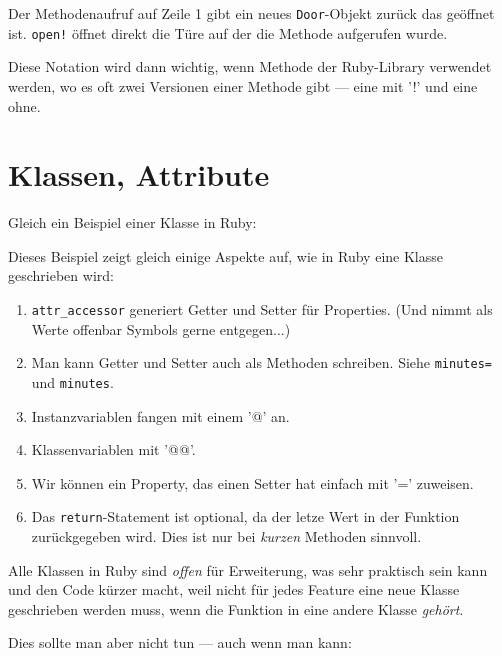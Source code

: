 \documentclass[a4book,11pt,twoside]{scrbook}
\begin{document}


Der Methodenaufruf auf Zeile 1 gibt ein neues \texttt{Door}-Objekt zurück das geöffnet ist. \texttt{open!} öffnet direkt die Türe auf der die Methode aufgerufen wurde.

Diese Notation wird dann wichtig, wenn Methode der Ruby-Library verwendet werden, wo es oft zwei Versionen einer Methode gibt — eine mit '!' und eine ohne.







\section{Klassen, Attribute} %
\label{sec:klassen_methoden_attribute}
Gleich ein Beispiel einer Klasse in Ruby:



Dieses Beispiel zeigt gleich einige Aspekte auf, wie in Ruby eine Klasse geschrieben wird:

\begin{enumerate}
	\item \texttt{attr\_accessor} generiert Getter und Setter für Properties. (Und nimmt als Werte offenbar Symbols gerne entgegen...)
	\item Man kann Getter und Setter auch als Methoden schreiben. Siehe \texttt{minutes=} und \texttt{minutes}.
	\item Instanzvariablen fangen mit einem '@' an.
	\item Klassenvariablen mit '@@'.
	\item Wir können ein Property, das einen Setter hat einfach mit '=' zuweisen.
	\item Das \texttt{return}-Statement ist optional, da der letze Wert in der Funktion zurückgegeben wird. Dies ist nur bei \emph{kurzen} Methoden sinnvoll.
\end{enumerate}

Alle Klassen in Ruby sind \emph{offen} für Erweiterung, was sehr praktisch sein kann und den Code kürzer macht, weil nicht für jedes Feature eine neue Klasse geschrieben werden muss, wenn die Funktion in eine andere Klasse \emph{gehört}.



Dies sollte man aber nicht tun — auch wenn man kann:


\end{document}
